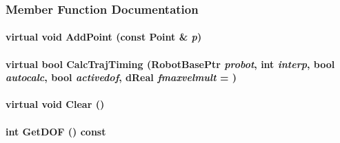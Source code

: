 \subsubsection{Member Function Documentation}
\hypertarget{classOpenRAVE_1_1TrajectoryBase_af75c151370d2a44fbd1c94bc2b6b06cd}{
\paragraph[{AddPoint}]{\setlength{\rightskip}{0pt plus 5cm}virtual void AddPoint (const {\bf Point} \& {\em p})}\hfill}
\label{classOpenRAVE_1_1TrajectoryBase_af75c151370d2a44fbd1c94bc2b6b06cd}
\hypertarget{classOpenRAVE_1_1TrajectoryBase_ae8962475965fc74539a8a1ff1c227f61}{
\paragraph[{CalcTrajTiming}]{\setlength{\rightskip}{0pt plus 5cm}virtual bool CalcTrajTiming (RobotBasePtr {\em probot}, \/  int {\em interp}, \/  bool {\em autocalc}, \/  bool {\em activedof}, \/  dReal {\em fmaxvelmult} = {})}\hfill}
\label{classOpenRAVE_1_1TrajectoryBase_ae8962475965fc74539a8a1ff1c227f61}
\hypertarget{classOpenRAVE_1_1TrajectoryBase_acff991618208e360f3c8f6af691fb947}{
\paragraph[{Clear}]{\setlength{\rightskip}{0pt plus 5cm}virtual void Clear ()}\hfill}
\label{classOpenRAVE_1_1TrajectoryBase_acff991618208e360f3c8f6af691fb947}
\hypertarget{classOpenRAVE_1_1TrajectoryBase_a181d63496678472a4e902bcea6fea659}{
\paragraph[{GetDOF}]{\setlength{\rightskip}{0pt plus 5cm}int GetDOF () const}\hfill}
